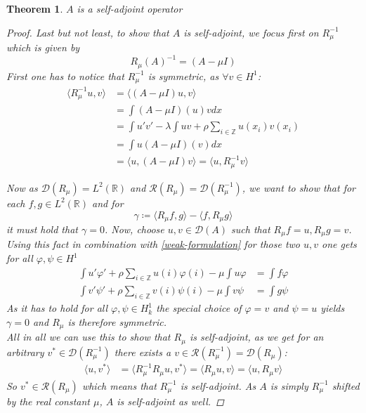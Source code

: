 \documentclass[fontsize=14pt,a4paper,DIV=1]{scrartcl}
\newtheorem{theorem}{Theorem}[section]
\numberwithin{equation}{section}
\newcommand{\R}{\mathbb{R}}
\newcommand{\Z}{\mathbb{Z}}
\begin{document}
	\begin{theorem}
		$A$ is a self-adjoint operator
		
		\begin{proof} %
			Last but not least, to show that $A$ is self-adjoint, we focus first on $R_{\mu}^{-1}$ which is given by 
				\[ R_{\mu}(A)^{-1} = (A - \mu I) \] 
			First one has to notice that $R_{\mu}^{-1}$ is symmetric, as $\forall v \in H^{1}$:
			\begin{align*}
				\langle R_{\mu}^{-1} u, v \rangle & = \langle (A - \mu I) u, v \rangle \\
					& = \int (A - \mu I)(u) v dx \\
					& = \int u'v' -  \lambda \int u v + \rho \sum_{i \in \Z} u(x_{i}) v(x_{i}) \\
					& = \int u (A - \mu I)(v) dx \\
					& = \langle u, (A - \mu I) v \rangle = \langle u,  R_{\mu}^{-1} v \rangle 
			\end{align*}

Now as $\mathcal{D}(R_{\mu}) = L^{2}(\R)$ and $\mathcal{R}(R_{\mu}) = \mathcal{D}(R_{\mu}^{-1})$, we want to show that for each $f, g \in L^{2}(\R)$ and for 
	\[ \gamma \coloneqq \langle R_{\mu} f, g \rangle - \langle f, R_{\mu} g \rangle \]
	it must hold that $\gamma = 0$. Now, choose $u, v \in \mathcal{D}(A)$ such that $R_{\mu}f = u, R_{\mu} g = v$. Using this fact in combination with \eqref{weak-formulation} for those two $u, v$ one gets for all $\varphi, \psi \in H^{1}$
\begin{align*}
	\int u' \varphi' + \rho \sum_{i \in \Z} u(i) \varphi(i) - \mu \int u \varphi & = \int f \varphi \\
	\int v' \psi' + \rho \sum_{i \in \Z} v(i) \psi(i) - \mu \int v \psi & = \int g \psi
\end{align*}
As it has to hold for all $\varphi, \psi \in H^{1}_{k}$ the special choice of $\varphi = v$ and $\psi = u$ yields $\gamma = 0$ and $R_{\mu}$ is therefore symmetric. \\
All in all we can use this to show that $R_{\mu}$ is self-adjoint, as we get for an arbitrary $v^{*} \in \mathcal{D}(R_{\mu}^{-1})$ there exists a $v \in \mathcal{R}(R_{\mu}^{-1}) = \mathcal{D}(R_{\mu})$: 
\begin{align*}
	\langle u, v^{*} \rangle & = \langle R_{\mu}^{-1} R_{\mu} u , v^{*} \rangle = \langle R_{\mu} u, v \rangle  = \langle  u, R_{\mu} v \rangle 
\end{align*}
So $v^{*} \in \mathcal{R}(R_{\mu})$ which means that $R_{\mu}^{-1}$ is self-adjoint. As $A$ is simply $R_{\mu}^{-1}$ shifted by the real constant $\mu$, $A$ is self-adjoint as well.		
		\end{proof}
	\end{theorem}
\end{document}
